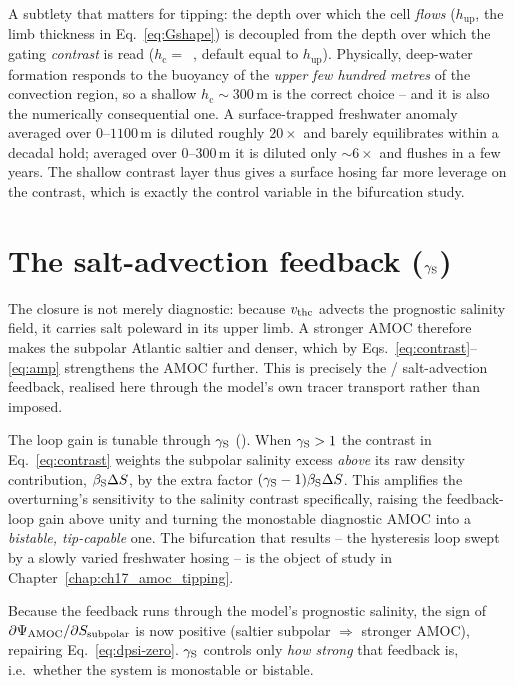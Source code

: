A subtlety that matters for tipping: the depth over which the cell \emph{flows}
($h_{\mathrm{up}}$, the limb thickness in Eq.~\eqref{eq:Gshape}) is decoupled
from the depth over which the gating \emph{contrast} is read
($h_{\mathrm{c}}=$~, default equal to $h_{\mathrm{up}}$).
Physically, deep-water formation responds to the buoyancy of the \emph{upper few
hundred metres} of the convection region, so a shallow $h_{\mathrm{c}}\sim300\,\mathrm{m}$
is the correct choice -- and it is also the numerically consequential one. A
surface-trapped freshwater anomaly averaged over $0$--$1100\,\mathrm{m}$ is diluted
roughly $20\times$ and barely equilibrates within a decadal hold; averaged over
$0$--$300\,\mathrm{m}$ it is diluted only $\sim6\times$ and flushes in a few years.
The shallow contrast layer thus gives a surface hosing far more leverage on the
contrast, which is exactly the control variable in the bifurcation study.

\section{The salt-advection feedback (\texorpdfstring{$\gamma_{\mathrm{S}}$}{haline\_gain})}

The closure is not merely diagnostic: because $v_{\mathrm{thc}}$ advects the prognostic
salinity field, it carries salt poleward in its upper limb. A stronger AMOC
therefore makes the subpolar Atlantic saltier and denser, which by
Eqs.~\eqref{eq:contrast}--\eqref{eq:amp} strengthens the AMOC further. This is
precisely the \citet{stommel1961}/\citet{marotzke1991} salt-advection feedback,
realised here through the model's own tracer transport rather than imposed.

The loop gain is tunable through $\gamma_{\mathrm{S}}$ (). When $\gamma_{\mathrm{S}}>1$
the contrast in Eq.~\eqref{eq:contrast} weights the subpolar salinity excess
\emph{above} its raw density contribution, $\beta_{\mathrm{S}}\Delta S$, by the extra factor
$(\gamma_{\mathrm{S}}-1)\beta_{\mathrm{S}}\Delta S$. This amplifies the overturning's sensitivity to the salinity
contrast specifically, raising the feedback-loop gain above unity and turning the
monostable diagnostic AMOC into a \emph{bistable, tip-capable} one. The bifurcation
that results -- the hysteresis loop swept by a slowly varied freshwater hosing -- is
the object of study in Chapter~\ref{chap:ch17_amoc_tipping}.

\begin{remark}
Because the feedback runs through the model's prognostic salinity, the sign of
$\partial\Psi_{\mathrm{AMOC}}/\partial S_{\mathrm{subpolar}}$ is now positive
(saltier subpolar $\Rightarrow$ stronger AMOC), repairing
Eq.~\eqref{eq:dpsi-zero}. $\gamma_{\mathrm{S}}$ controls only \emph{how strong} that feedback
is, i.e.\ whether the system is monostable or bistable.
\end{remark}

